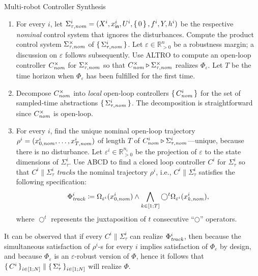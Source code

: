 \begin{algorithm}
\caption{Multi-robot Controller Synthesis}
\label{alg:main}
\begin{enumerate}
	\item For every $i$, let $\Sigma_{\tau,\mathit{nom}}^i = (X^i,x_{\mathsf{in}}^i,U^i,\set{0},f^i,Y,h^i)$ be the respective \emph{nominal} control system that ignores the disturbances.
			Compute the product control system $\Sigma^\times_{\tau,\mathit{nom}}$ of $\set{\Sigma^i_{\tau,\mathit{nom}}}$. 
			Let $\varepsilon\in \mathbb{R}^n_{>0}$ be a robustness margin; a discussion on $\varepsilon$ follows subsequently.
			Use ALTRO to compute an open-loop controller $C^\times_{\mathit{nom}}$ for $\Sigma^\times_{\tau,\mathit{nom}}$ so that $C^\times_{\mathit{nom}}\triangleright\Sigma_{\tau,\mathit{nom}}^{\times}$ realizes  $\Phi_\varepsilon$.
			Let $T$ be the time horizon when $\Phi_\varepsilon$ has been fulfilled for the first time. \label{step:altro}
	\item Decompose $C^\times_{\mathit{nom}}$ into \emph{local} open-loop controllers $\set{C^i_{\mathit{nom}}}$ for the set of sampled-time abstractions $\set{\Sigma^i_{\tau,\mathit{nom}}}$.
			The decomposition is straightforward since $C^\times_{\mathit{nom}}$ is open-loop.
	\item For every $i$, find the unique nominal open-loop trajectory $\rho^i=(x_{0,\mathit{nom}}^i,\ldots,x_{T,\mathit{nom}}^i)$ of length $T$ of $C^i_{\mathit{nom}}\triangleright \Sigma_{\tau,\mathit{nom}}^i$---unique, because there is no disturbance. \label{step:abcd}
			Let $\varepsilon^i\in \mathbb{R}^{n_i}_{>0}$ be the projection of $\varepsilon$ to the state dimensions of $\Sigma_{\tau}^i$.
			Use ABCD to find a closed loop controller $C^i$ for $\Sigma_{\tau}^i$ so that $C^i\parallel \Sigma_\tau^i$ \emph{tracks} the nominal trajectory $\rho^i$, i.e., $C^i\parallel \Sigma_\tau^i$ satisfies the following specification:
			\begin{align}
				\label{eq:ltl_spec}
				\Phi_{\mathit{track}}^i\coloneqq \Omega_{\varepsilon^i}(x_{0,\mathit{nom}}^i) \wedge \bigwedge_{k\in [1;T]} \bigcirc^t \Omega_{\varepsilon^i}(x_{k,\mathit{nom}}^i),
			\end{align}
			where $\bigcirc^t$ represents the juxtaposition of $t$ consecutive ``$\bigcirc$'' operators.
\end{enumerate}
\end{algorithm}

It can be observed that if every  $C^i\parallel \Sigma_\tau^i$ can realize $\Phi_{\mathit{track}}^i$, then because the simultaneous satisfaction of $\rho^i$-s for every $i$ implies satisfaction of $\Phi_\varepsilon$ by design, and because $\Phi_\varepsilon$ is an $\varepsilon$-robust version of $\Phi$, hence it follows that $\set{C^i}_{i\in [1;N]}\parallel \set{\Sigma_\tau^i}_{i\in [1;N]}$ will realize $\Phi$.

